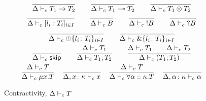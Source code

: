 \begin{figure}[tp]
  \begin{gather*}
    \frac{}{\GEnv \Contr T_1 \to T_2}%
    \qquad
    \frac{}{\GEnv \Contr T_1 \multimap T_2} %
    \qquad
    \frac{}{\GEnv \Contr T_1 \otimes T_2} %
    \\
    \frac{}{\GEnv \Contr [l_i:T_i]_{i\in I}} %
    \qquad
    \frac{}{\GEnv \Contr B} %
    \qquad
    \frac{}{\GEnv \Contr {!B}} %
    \qquad
    \frac{}{\GEnv \Contr {?B}} %
    \\
    \frac{}{\GEnv \Contr \oplus\{l_i\colon T_i\}_{i\in I}} %
    \qquad
    \frac{}{\GEnv \Contr \&\{l_i\colon T_i\}_{i\in I}} %
    \\
    \frac{}{\GEnv \Contr \skipk} %
    \qquad
    \frac{\GEnv \Contr T_1 }{ %
      \GEnv \Contr T_1;T_2} %
    \qquad
    \frac{\GEnv \Contr T_1 %
      \qquad \GEnv \Contr T_2}{ %
      \GEnv  \Contr (T_1;T_2)} %
    \\
    \frac{\GEnv \Contr T}{\GEnv \Contr \mu x.T } %
    \quad
    \frac{ }{\GEnv, x\colon\kind \Contr x } %
    \quad
    \frac{\GEnv \Contr T}{\GEnv \Contr \forall\alpha::\kind.T } %
    \quad
    \frac{ }{\GEnv, \alpha\colon\kind \Contr \alpha } %
  \end{gather*}
  \caption{Contractivity, $\Delta \vdash_{c} T$} %
  \label{fig:contractivity}
\end{figure}

